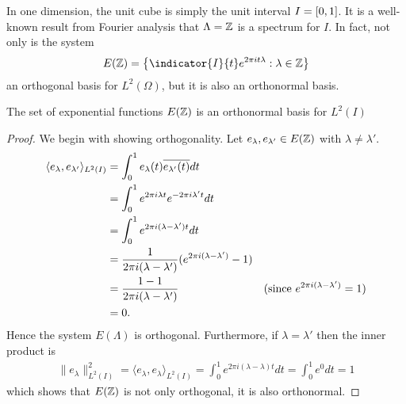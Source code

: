 \documentclass[../thesis.tex]{subfiles}
\begin{document}
In one dimension, the unit cube is simply the unit interval $I=[0,1]$. It is a well-known result from Fourier analysis that $\Lambda = \mathbb{Z}$ is a spectrum for $I$. In fact, not only is the system
\begin{equation*}
    E(\Z) = \braqMed{\indicator{I}{t} e^{2\pi i t \lambda} : \lambda \in \Z}
\end{equation*} 
an orthogonal basis for $L^2(\Omega)$, but it is also an orthonormal basis.
\begin{lemma}\label{lem:exp_onb_onedim}
    The set of exponential functions $E(\mathbb{Z})$ is an orthonormal basis for $L^2(I)$
\end{lemma}
\begin{proof}
    We begin with showing orthogonality. Let $e_{\lambda}, e_{\lambda'} \in E(\mathbb{Z})$ with $\lambda \neq \lambda'$. %
    \begin{align}\label{eq:orthog_one_dim_req}
        \langle e_{\lambda},e_{\lambda'} \rangle_{L^2(I)} &= \int_0^1 e_{\lambda}(t)\overline{e_{\lambda'}(t)} dt \nonumber\\ 
        &= \int_0^1 e^{2 \pi i {\lambda}t} e^{-2 \pi i {\lambda'}t} dt \nonumber\\
        &= \int_0^1 e^{2 \pi i (\lambda-\lambda')t} dt \nonumber\\
        &=\frac{1}{2 \pi i (\lambda-\lambda')} (e^{2 \pi i (\lambda - \lambda')} -1) \\
        &=\frac{1-1}{2 \pi i (\lambda-\lambda')} & (\text{since } e^{2 \pi i (\lambda-\lambda')} = 1) \nonumber\\
        &= 0 \nonumber.
    \end{align}
    Hence the system $E(\Lambda)$ is orthogonal. Furthermore, if $\lambda =\lambda'$ then the inner product is
    \begin{align*}\label{eq:exp_norm_one}
        \| e_\lambda \|^2_{L^2(I)} 
        = \langle e_{\lambda},e_{\lambda} \rangle_{L^2(I)} 
        = \int_0^1 e^{2 \pi i (\lambda-\lambda)t} dt
        = \int_0^1 e^{0} dt = 1
    \end{align*}
    which shows that $E(\mathbb{Z})$ is not only orthogonal, it is also orthonormal. 


\end{proof}
\end{document}
